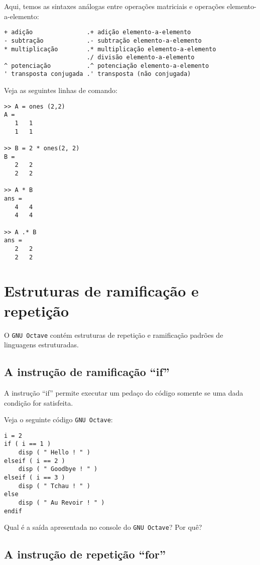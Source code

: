 Aqui, temos as sintaxes análogas entre operações matriciais e operações elemento-a-elemento:
\begin{verbatim}
+ adição               .+ adição elemento-a-elemento
- subtração            .- subtração elemento-a-elemento
* multiplicação        .* multiplicação elemento-a-elemento
                       ./ divisão elemento-a-elemento
^ potenciação          .^ potenciação elemento-a-elemento
' transposta conjugada .' transposta (não conjugada)
\end{verbatim}

\begin{ex}
  Veja as seguintes linhas de comando:
\begin{verbatim}
>> A = ones (2,2)
A =
   1   1
   1   1

>> B = 2 * ones(2, 2)
B =
   2   2
   2   2

>> A * B
ans =
   4   4
   4   4

>> A .* B
ans =
   2   2
   2   2
\end{verbatim}
\end{ex}

\section{Estruturas de ramificação e repetição}

O \verb+GNU Octave+ contém estruturas de repetição e ramificação padrões de linguagens estruturadas.

\subsection{A instrução de ramificação ``if''}

A instrução ``if'' permite executar um pedaço do código somente se uma dada condição for satisfeita.

\begin{ex}
  Veja o seguinte código \verb+GNU Octave+:
\begin{verbatim}
i = 2
if ( i == 1 )
    disp ( " Hello ! " )
elseif ( i == 2 )
    disp ( " Goodbye ! " )
elseif ( i == 3 )
    disp ( " Tchau ! " )
else
    disp ( " Au Revoir ! " )
endif
\end{verbatim}
Qual é a saída apresentada no console do \verb+GNU Octave+? Por quê?
\end{ex}

\subsection{A instrução de repetição ``for''}

